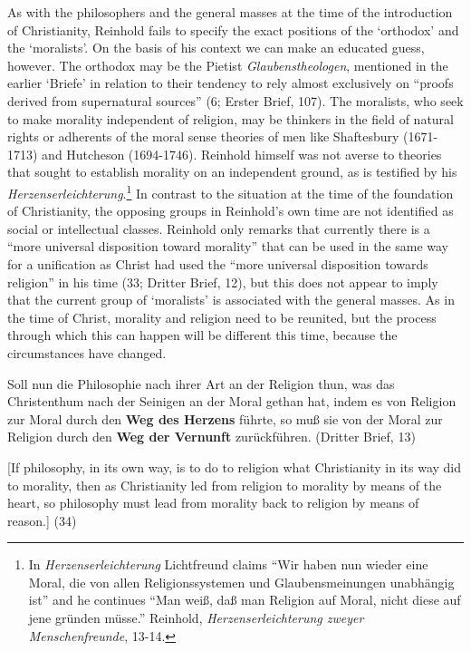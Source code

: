 As with the philosophers and the general masses at the time of the introduction of Christianity, Reinhold fails to specify the exact positions of the `orthodox' and the `moralists'. On the basis of his context we can make an educated guess, however. The orthodox may be the Pietist \textit{Glaubenstheologen}, mentioned in the earlier `Briefe' in relation to their tendency to rely almost exclusively on ``proofs derived from supernatural sources'' (6; Erster Brief, 107). The moralists, who seek to make morality independent of religion, may be thinkers in the field of natural rights or adherents of the moral sense theories of men like Shaftesbury (1671{-}1713) and Hutcheson (1694{-}1746). Reinhold himself was not averse to theories that sought to establish morality on an independent ground, as is testified by his \textit{Herzenserleichterung}.\footnote{ In \textit{Herzenserleichterung} Lichtfreund claims ``Wir haben nun wieder eine Moral, die von allen Religionssystemen und Glaubensmeinungen unabh\"{a}ngig ist'' and he continues ``Man wei\ss{}, da\ss{} man Religion auf Moral, nicht diese auf jene gr\"{u}nden m\"{u}sse.'' Reinhold, \textit{Herzenserleichterung zweyer Menschenfreunde}, 13{-}14. } In contrast to the situation at the time of the foundation of Christianity, the opposing groups in Reinhold's own time are not identified as social or intellectual classes. Reinhold only remarks that currently there is a ``more universal disposition toward morality'' that can be used in the same way for a unification as Christ had used the ``more universal disposition towards religion'' in his time (33; Dritter Brief, 12), but this does not appear to imply that the current group of `moralists' is associated with the general masses. As in the time of Christ, morality and religion need to be reunited, but the process through which this can happen will be different this time, because the circumstances have changed. 

Soll nun die Philosophie nach ihrer Art an der Religion thun, was das Christenthum nach der Seinigen an der Moral gethan hat, indem es von Religion zur Moral durch den \textbf{Weg des Herzens} f\"{u}hrte, so mu\ss{} sie von der Moral zur Religion durch den \textbf{Weg der Vernunft} zur\"{u}ckf\"{u}hren. (Dritter Brief, 13)

[If philosophy, in its own way, is to do to religion what Christianity in its way did to morality, then as Christianity led from religion to morality by means of the heart, so philosophy must lead from morality back to religion by means of reason.] (34)


